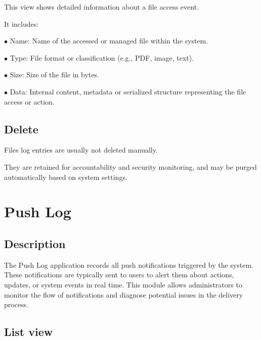 \documentclass[a4paper]{article}
\begin{document}
This view shows detailed information about a file access event.

It includes:

\begin{compactitem}
\item[\color{myblue}$\bullet$] Name: Name of the accessed or managed file within the system.
\item[\color{myblue}$\bullet$] Type: File format or classification (e.g., PDF, image, text).
\item[\color{myblue}$\bullet$] Size: Size of the file in bytes.
\item[\color{myblue}$\bullet$] Data: Internal content, metadata or serialized structure representing the file access or action.
\end{compactitem}

\hypertarget{toc20}{}
\subsection{Delete}

Files log entries are usually not deleted manually.

They are retained for accountability and security monitoring, and may be purged automatically based on system settings.


\hypertarget{toc21}{}
\section{Push Log}

\hypertarget{toc22}{}
\subsection{Description}

The Push Log application records all push notifications triggered by the system.
These notifications are typically sent to users to alert them about actions, updates, or system events in real time.
This module allows administrators to monitor the flow of notifications and diagnose potential issues in the delivery process.

\hypertarget{toc23}{}
\subsection{List view}
\end{document}
